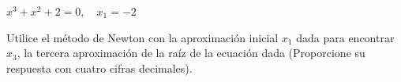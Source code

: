 \item $x^3 + x^2 + 2 = 0, \quad x_1 = -2$
\par
Utilice el método de Newton con la aproximación inicial $x_1$ dada para encontrar $x_3$, la tercera aproximación de la raíz de la ecuación dada (Proporcione su respuesta con cuatro cifras decimales).
